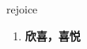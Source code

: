 
\begin{frame}
{\huge rejoice}
\begin{center}
\begin{enumerate}\Large
  \item \textbf{欣喜，喜悦}
\end{enumerate}
\end{center}
\end{frame}
